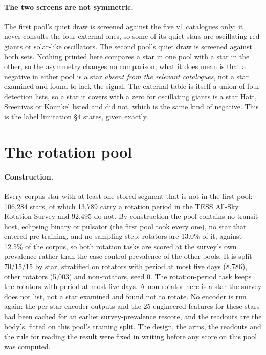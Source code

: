 \documentclass{article}
\begin{document}
\paragraph{The two screens are not symmetric.} The first pool's quiet draw is screened against the
five v1 catalogues only; it never consults the four external ones, so some of its quiet stars are
oscillating red giants or solar-like oscillators. The second pool's quiet draw is screened against
both sets. Nothing printed here compares a star in one pool with a star in the other, so the
asymmetry changes no comparison; what it does mean is that a negative in either pool is a star
\emph{absent from the relevant catalogues}, not a star examined and found to lack the signal. The
external table is itself a union of four detection lists, so a star it covers with a zero for
oscillating giants is a star Hatt, Sreenivas or Kounkel listed and \citet{hon2021} did not, which is
the same kind of negative. This is the label limitation \S4 states, given exactly.

\section{The rotation pool}
\label{app:rotpool}

\paragraph{Construction.} Every corpus star with at least one stored segment that is not in the
first pool: 106{,}284 stars, of which 13{,}789 carry a rotation period in the TESS All-Sky Rotation
Survey \citep{boyle2026} and 92{,}495 do not. By construction the pool contains no transit host,
eclipsing binary or pulsator (the first pool took every one), no star that entered pre-training, and
no sampling step: rotators are 13.0\% of it, against 12.5\% of the corpus, so both rotation tasks are
scored at the survey's own prevalence rather than the case-control prevalence of the other pools. It
is split 70/15/15 by star, stratified on rotators with period at most five days (8{,}786), other
rotators (5{,}003) and non-rotators, seed 0. The rotation-period task keeps the rotators with period
at most five days. A non-rotator here is a star the survey does not list, not a star examined and
found not to rotate. No encoder is run again: the per-star encoder outputs and the 25 engineered
features for these stars had been cached for an earlier survey-prevalence rescore, and the readouts
are the body's, fitted on this pool's training split. The design, the arms, the readouts and the rule
for reading the result were fixed in writing before any score on this pool was computed.
\end{document}
